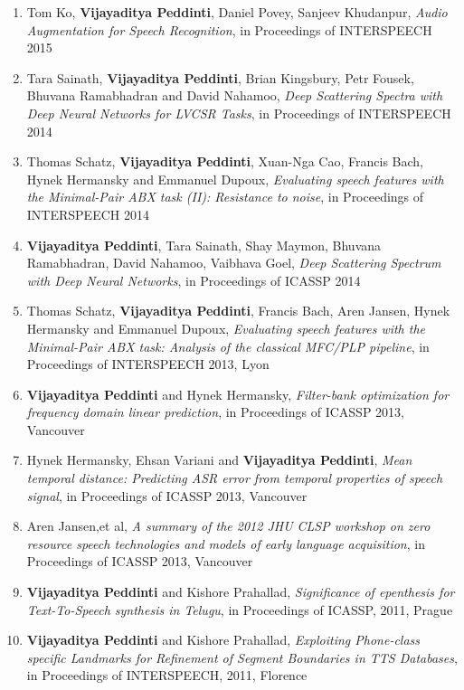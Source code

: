 \documentclass[margin,line,pifont,palatino,courier]{res}
\begin{document}
\begin{resume}
\begin{enumerate}
\item Tom Ko, \textbf{Vijayaditya Peddinti}, Daniel Povey, Sanjeev Khudanpur,
\textit{Audio Augmentation for Speech Recognition}, in Proceedings of INTERSPEECH 2015

\item Tara Sainath, \textbf{Vijayaditya Peddinti}, Brian Kingsbury, Petr Fousek, Bhuvana Ramabhadran and David Nahamoo,
\textit{Deep Scattering Spectra with Deep Neural Networks for LVCSR Tasks}, in Proceedings of INTERSPEECH 2014

\item Thomas Schatz, \textbf{Vijayaditya Peddinti}, Xuan-Nga Cao, Francis Bach, Hynek Hermansky and Emmanuel Dupoux,
\textit{Evaluating speech features with the Minimal-Pair ABX task (II): Resistance to noise}, in Proceedings of INTERSPEECH 2014

\item \textbf{Vijayaditya Peddinti}, Tara Sainath, Shay Maymon, Bhuvana Ramabhadran, David Nahamoo, Vaibhava Goel,
\textit{Deep Scattering Spectrum with Deep Neural Networks}, in Proceedings of ICASSP 2014

\item Thomas Schatz, \textbf{Vijayaditya Peddinti}, Francis Bach, Aren Jansen, Hynek Hermansky and Emmanuel Dupoux,
\textit{Evaluating speech features with the Minimal-Pair ABX task: Analysis of the classical MFC/PLP pipeline}, in Proceedings of INTERSPEECH 2013, Lyon

\item \textbf{Vijayaditya Peddinti} and Hynek Hermansky,
\textit{Filter-bank optimization for frequency domain linear prediction}, in Proceedings of ICASSP 2013, Vancouver

\item Hynek Hermansky, Ehsan Variani and \textbf{Vijayaditya Peddinti},
\textit{Mean temporal distance: Predicting ASR error from temporal properties of speech signal}, in Proceedings of ICASSP 2013, Vancouver

\item Aren Jansen,et al, 
\textit{A summary of the 2012 JHU CLSP workshop on zero resource speech technologies and models of early language acquisition}, in Proceedings of ICASSP 2013, Vancouver


\item \textbf{Vijayaditya Peddinti} and Kishore Prahallad,
\textit{Significance of epenthesis for Text-To-Speech synthesis in Telugu}, in Proceedings of ICASSP, 2011, Prague

\item \textbf{Vijayaditya Peddinti} and Kishore Prahallad,
\textit{Exploiting Phone-class specific Landmarks for Refinement of Segment Boundaries in TTS Databases}, in Proceedings of INTERSPEECH, 2011, Florence


\end{enumerate}
\end{resume}
\end{document}
